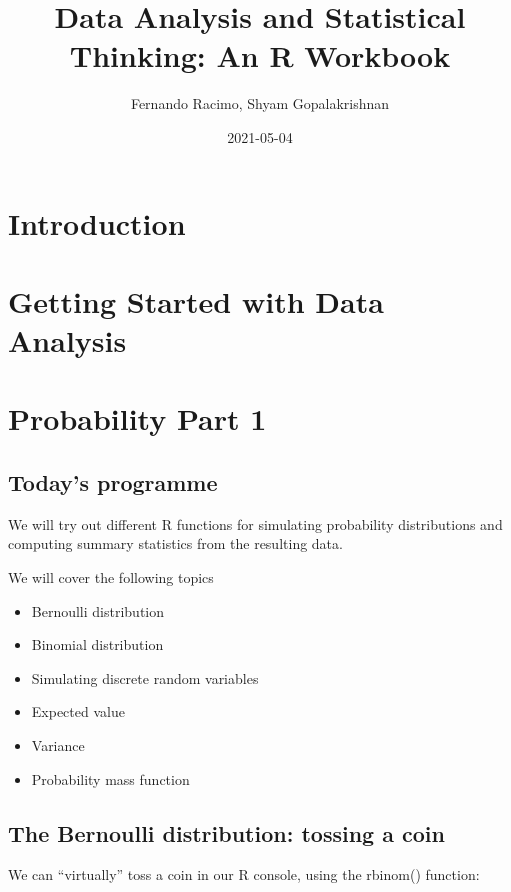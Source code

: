 \documentclass[
]{book}
\title{Data Analysis and Statistical Thinking: An R Workbook}
\author{Fernando Racimo, Shyam Gopalakrishnan}
\date{2021-05-04}
\providecommand{\tightlist}{%
  \setlength{\itemsep}{0pt}\setlength{\parskip}{0pt}}
\begin{document}
\maketitle

{
\setcounter{tocdepth}{1}
\tableofcontents
}
\hypertarget{introduction}{%
\chapter{Introduction}\label{introduction}}

\hypertarget{intro}{%
\chapter{Getting Started with Data Analysis}\label{intro}}

\hypertarget{prob1}{%
\chapter{Probability Part 1}\label{prob1}}

\hypertarget{todays-programme}{%
\section{Today's programme}\label{todays-programme}}

We will try out different R functions for simulating probability distributions and computing summary statistics from the resulting data.

We will cover the following topics

\begin{itemize}
\tightlist
\item
  Bernoulli distribution
\item
  Binomial distribution
\item
  Simulating discrete random variables
\item
  Expected value
\item
  Variance
\item
  Probability mass function
\end{itemize}

\hypertarget{the-bernoulli-distribution-tossing-a-coin}{%
\section{The Bernoulli distribution: tossing a coin}\label{the-bernoulli-distribution-tossing-a-coin}}

We can ``virtually'' toss a coin in our R console, using the rbinom() function:
\end{document}
